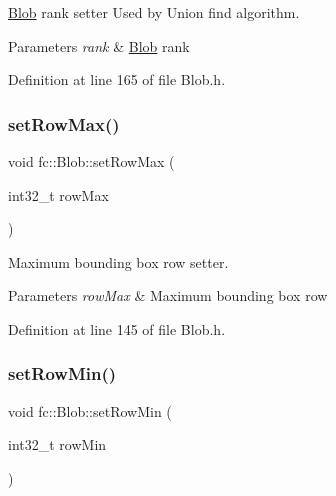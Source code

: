 \hyperlink{classfc_1_1Blob}{Blob} rank setter Used by Union find algorithm. 


\begin{DoxyParams}{Parameters}
{\em rank} & \hyperlink{classfc_1_1Blob}{Blob} rank \\
\hline
\end{DoxyParams}


Definition at line 165 of file Blob.\+h.

\mbox{\label{classfc_1_1Blob_af726d6434723c76d5c9e793a99a01408}} 
\subsubsection{\texorpdfstring{set\+Row\+Max()}{setRowMax()}}
{\footnotesize\ttfamily void fc\+::\+Blob\+::set\+Row\+Max (\begin{DoxyParamCaption}\item[{int32\+\_\+t}]{row\+Max }\end{DoxyParamCaption})\hspace{0.3cm}{\ttfamily [inline]}}



Maximum bounding box row setter. 


\begin{DoxyParams}{Parameters}
{\em row\+Max} & Maximum bounding box row \\
\hline
\end{DoxyParams}


Definition at line 145 of file Blob.\+h.

\mbox{\label{classfc_1_1Blob_a14a42d0f0fe5a8c06444609027faecbe}} 
\subsubsection{\texorpdfstring{set\+Row\+Min()}{setRowMin()}}
{\footnotesize\ttfamily void fc\+::\+Blob\+::set\+Row\+Min (\begin{DoxyParamCaption}\item[{int32\+\_\+t}]{row\+Min }\end{DoxyParamCaption})\hspace{0.3cm}{\ttfamily [inline]}}



